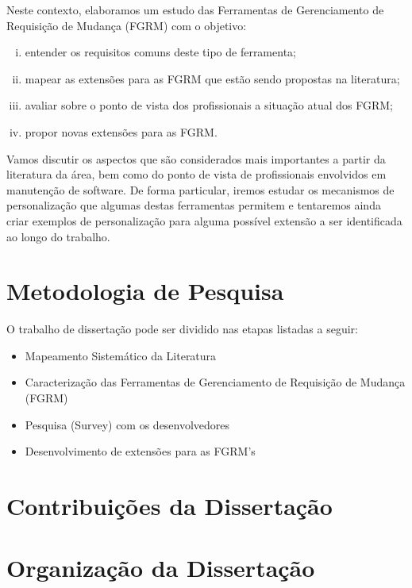 Neste contexto, elaboramos um estudo das Ferramentas de Gerenciamento de Requisição de Mudança (FGRM) com o objetivo:
\begin{enumerate}[(i)]
	\item entender os requisitos comuns deste tipo de ferramenta;
	\item mapear as extensões para as FGRM que estão sendo propostas na literatura;
	\item avaliar sobre o ponto de vista dos profissionais a situação atual dos FGRM\@;
	\item propor novas extensões para as FGRM\@.  
\end{enumerate}


Vamos discutir os aspectos que são considerados mais importantes a partir da literatura da área, bem
como do ponto de vista de profissionais envolvidos em manutenção de software. De forma particular,
iremos estudar os mecanismos de personalização que algumas destas ferramentas permitem e tentaremos
ainda criar exemplos de personalização para alguma possível extensão a ser identificada ao longo do
trabalho.

\section{Metodologia de Pesquisa}
\label{sec:intro-metodologia}

O trabalho de dissertação pode ser dividido nas etapas listadas a seguir:

\begin{itemize}[(i)]
	\item Mapeamento Sistemático da Literatura~\cite{keele2007guidelines}
	\item Caracterização das Ferramentas de Gerenciamento de Requisição de Mudança (FGRM)
	\item Pesquisa (Survey) com os desenvolvedores~\cite{wohlin2012experimentation}
	\item Desenvolvimento de extensões para as FGRM's
\end{itemize}

\section{Contribuições da Dissertação}
\label{sec:intro-contribuicao}

\section{Organização da Dissertação}
\label{sec:intro-organizacao-dissertacao}
